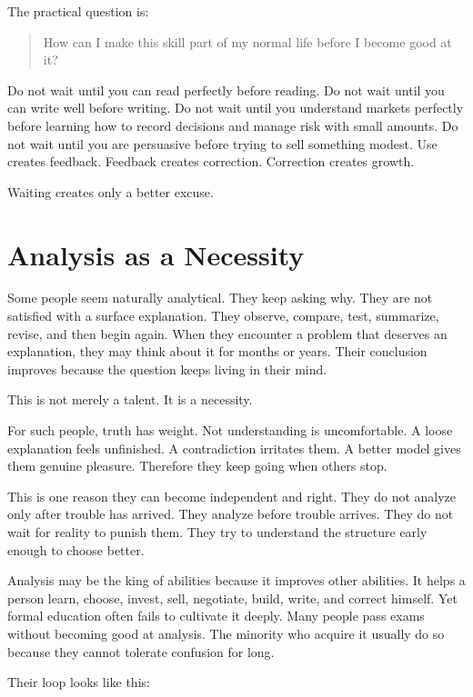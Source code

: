 The practical question is:

\begin{quote}
How can I make this skill part of my normal life before I become good at it?
\end{quote}

Do not wait until you can read perfectly before reading. Do not wait until you can write well before writing. Do not wait until you understand markets perfectly before learning how to record decisions and manage risk with small amounts. Do not wait until you are persuasive before trying to sell something modest. Use creates feedback. Feedback creates correction. Correction creates growth.

Waiting creates only a better excuse.

\section*{Analysis as a Necessity}

Some people seem naturally analytical. They keep asking why. They are not satisfied with a surface explanation. They observe, compare, test, summarize, revise, and then begin again. When they encounter a problem that deserves an explanation, they may think about it for months or years. Their conclusion improves because the question keeps living in their mind.

This is not merely a talent. It is a necessity.

For such people, truth has weight. Not understanding is uncomfortable. A loose explanation feels unfinished. A contradiction irritates them. A better model gives them genuine pleasure. Therefore they keep going when others stop.

This is one reason they can become independent and right. They do not analyze only after trouble has arrived. They analyze before trouble arrives. They do not wait for reality to punish them. They try to understand the structure early enough to choose better.

Analysis may be the king of abilities because it improves other abilities. It helps a person learn, choose, invest, sell, negotiate, build, write, and correct himself. Yet formal education often fails to cultivate it deeply. Many people pass exams without becoming good at analysis. The minority who acquire it usually do so because they cannot tolerate confusion for long.

Their loop looks like this:


